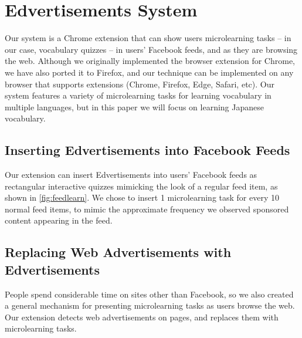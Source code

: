 \documentclass{sigchi}
\begin{document}


\section{Edvertisements System}

Our system is a Chrome extension that can show users microlearning tasks -- in our case, vocabulary quizzes -- in users' Facebook feeds, and as they are browsing the web. Although we originally implemented the browser extension for Chrome, we have also ported it to Firefox, and our technique can be implemented on any browser that supports extensions (Chrome, Firefox, Edge, Safari, etc). Our system features a variety of microlearning tasks for learning vocabulary in multiple languages, but in this paper we will focus on learning Japanese vocabulary.



\subsection{Inserting Edvertisements into Facebook Feeds}

Our extension can insert Edvertisements into users' Facebook feeds as rectangular interactive quizzes mimicking the look of a regular feed item, as shown in \autoref{fig:feedlearn}. We chose to insert 1 microlearning task for every 10 normal feed items, to mimic the approximate frequency we observed sponsored content appearing in the feed.

\subsection{Replacing Web Advertisements with Edvertisements}

People spend considerable time on sites other than Facebook, so we also created a general mechanism for presenting microlearning tasks as users browse the web. Our extension detects web advertisements on pages, and replaces them with microlearning tasks.

\end{document}
